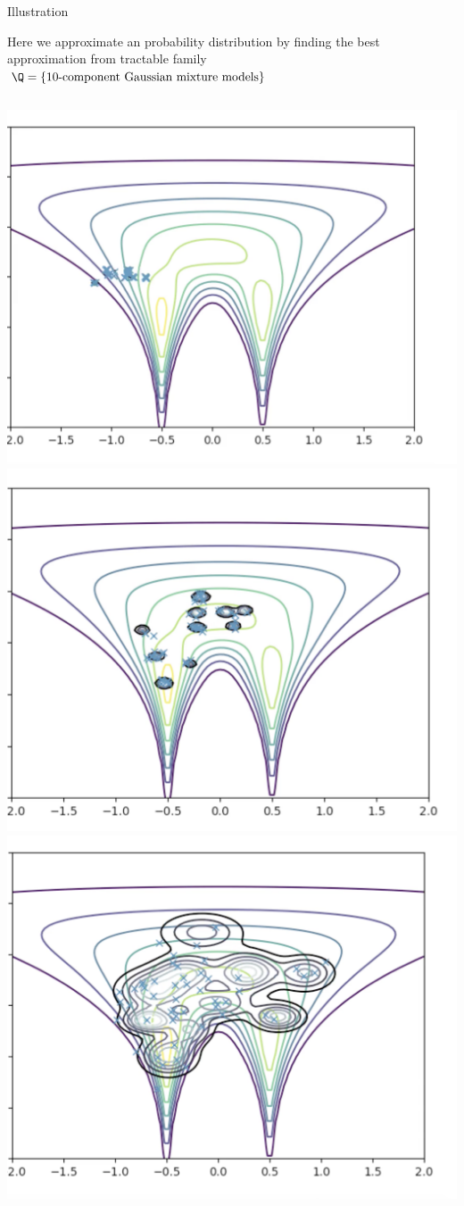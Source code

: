 \documentclass[10pt]{beamer}
\begin{document}
\begin{frame}{Illustration}

 \begin{minipage}[t][.9\textheight]{\textwidth}
  
Here we approximate an probability distribution by finding the best approximation from tractable family $\Q = \{ \text{10-component Gaussian mixture models} \}$ 

\begin{columns}[t]
\centering
\includegraphics[width=.7\textwidth]{images/intro_animation_1.png}\\
\includegraphics[width=.7\textwidth]{images/intro_animation_2.png}
\centering
\includegraphics[width=.7\textwidth]{images/intro_animation_3.png}\\

\end{columns}
\end{minipage}
\end{frame}
\end{document}
